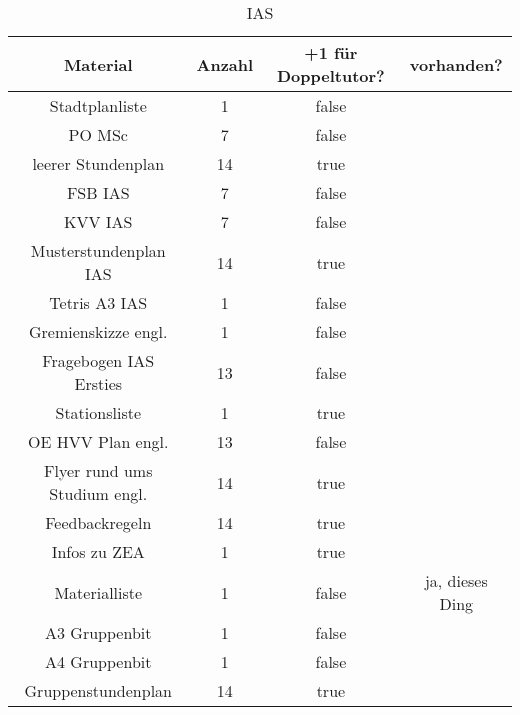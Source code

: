 \documentclass[10pt,a4paper,oneside,ngerman,numbers=noenddot]{scrartcl}
\begin{document}
\begin{table}[ht]
	\caption{IAS}
	\begin{tabular}{c|c|c|c}
		\textbf{Material} & \textbf{Anzahl} & \textbf{+1 für Doppeltutor?} & \textbf{vorhanden?} \\
		\hline
		Stadtplanliste & 1 & false & \\
		\hline
		PO MSc & 7 & false & \\
		\hline
		leerer Stundenplan & 14 & true & \\
		\hline
		FSB IAS & 7 & false & \\
		\hline
		KVV IAS & 7 & false & \\
		\hline
		Musterstundenplan IAS & 14 & true & \\
		\hline
		Tetris A3 IAS & 1 & false & \\
		\hline
		Gremienskizze engl. & 1 & false & \\
		\hline
		Fragebogen IAS Ersties & 13 & false & \\
		\hline
		Stationsliste & 1 & true & \\
		\hline
		OE HVV Plan engl. & 13 & false & \\
		\hline
		Flyer rund ums Studium engl. & 14 & true & \\
		\hline
		Feedbackregeln & 14 & true & \\
		\hline
		Infos zu ZEA & 1 & true & \\
		\hline
		Materialliste & 1 & false & ja, dieses Ding \\
		\hline
		A3 Gruppenbit & 1 & false & \\
		\hline
		A4 Gruppenbit & 1 & false & \\
		\hline
		Gruppenstundenplan & 14 & true &
	\end{tabular}
\end{table}
\end{document}
